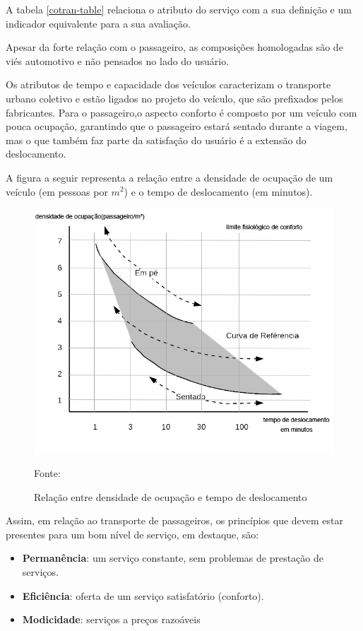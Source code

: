 A tabela \ref{cotran-table} relaciona o atributo do serviço com a sua definição e um indicador equivalente para a sua avaliação.



Apesar da forte relação com o passageiro, as composições homologadas são de viés automotivo e não pensados no lado do usuário.
 
Os atributos de tempo e capacidade dos veículos caracterizam o transporte urbano coletivo e estão ligados no projeto do veículo, que são prefixados pelos fabricantes. Para o passageiro,o aspecto conforto é composto por um veículo com pouca ocupação, garantindo que o passageiro estará sentado durante a viagem, mas o que também faz parte da satisfação do usuário é a extensão do deslocamento.

A figura a seguir representa a relação entre a densidade de ocupação de um veículo (em pessoas por $m^2$) e o tempo de deslocamento (em minutos).

\begin{figure}[H]
  \centering
  \caption{Relação entre densidade de ocupação e tempo de deslocamento}
 \includegraphics[scale=0.55]{imagens/limite-fisiologico.png} \par
\bigskip
Fonte: \cite[p.307]{MARTINS}
\end{figure}
Assim, em relação ao transporte de passageiros, os princípios que devem estar presentes para um bom nível de serviço, em destaque, são: 
\begin{itemize}
    \item \textbf{Permanência}: um serviço constante, sem problemas de prestação de serviços.
    \item \textbf{Eficiência}: oferta de um serviço satisfatório (conforto).
    \item \textbf{Modicidade}: serviços a preços razoáveis
\end{itemize}

